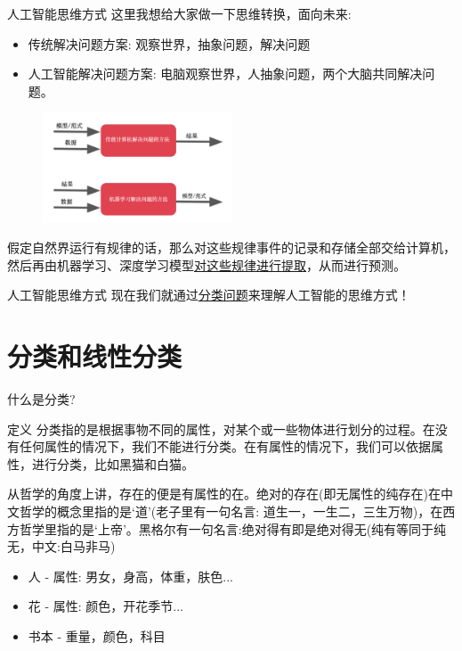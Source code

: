 \documentclass[handout]{beamer}
\begin{document}
\begin{frame}{人工智能思维方式}
	这里我想给大家做一下思维转换，面向未来:
	\begin{itemize}
		\item 传统解决问题方案: 观察世界，抽象问题，解决问题
		\item 人工智能解决问题方案: 电脑观察世界，人抽象问题，两个大脑共同解决问题。
	\end{itemize}
	\begin{figure}[H]
		\centering
		\includegraphics[width=0.5\textwidth]{fig/C1MLbigpct}
	\end{figure}
	假定自然界运行有规律的话，那么对这些规律事件的记录和存储全部交给计算机，然后再由机器学习、深度学习模型\underline{对这些规律进行提取}，从而进行预测。
\end{frame}

\begin{frame}{人工智能思维方式}
现在我们就通过\underline{分类问题}来理解人工智能的思维方式！	
\end{frame}


\section{分类和线性分类}

\begin{frame}{什么是分类?}
	\begin{block}{定义}
	分类指的是根据事物不同的属性，对某个或一些物体进行划分的过程。在没有任何属性的情况下，我们不能进行分类。在有属性的情况下，我们可以依据属性，进行分类，比如黑猫和白猫。
\end{block}

从哲学的角度上讲，存在的便是有属性的在。绝对的存在(即无属性的纯存在)在中文哲学的概念里指的是`道’(老子里有一句名言: 道生一，一生二，三生万物)，在西方哲学里指的是`上帝'。黑格尔有一句名言:绝对得有即是绝对得无(纯有等同于纯无，中文:白马非马)
\begin{itemize}
	\item 人 - 属性: 男女，身高，体重，肤色...
	\item 花 - 属性: 颜色，开花季节...
	\item 书本 - 重量，颜色，科目
\end{itemize}
\end{frame}
\end{document}
